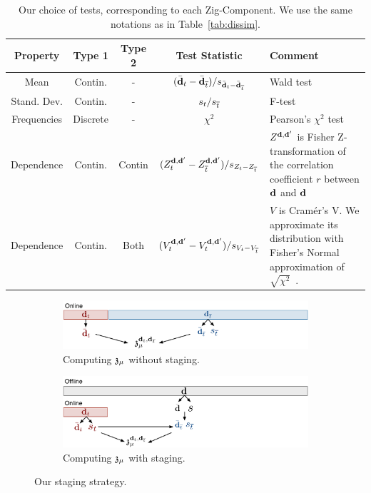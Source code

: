 \begin{table}[t!]
    \centering
    \begin{tabular}{c c c c p{8cm}}
    \rowcolor{gray!50}
      \hline
      Property & Type 1 & Type 2 & Test Statistic & Comment\\
      \hline
      Mean & Contin.  & - & $(\bar{\bf{d}}_t - \bar{\bf{d}}_{\overline{t}})/s_{\bar{\bf{d}}_t - \bar{\bf{d}}_{\overline{t}}}$ &
        Wald test~\cite{wasserman2013all}  \\
        Stand. Dev.& Contin.  & - & $s_t / s_{\overline{t}}$ &
        F-test~\cite{cohen1977statistical} \\
        Frequencies & Discrete & - & $\chi^2$ & Pearson's $\chi^2$
        test~\cite{wasserman2013all}\\
      Dependence  & Contin. & Contin & $(Z^{\bf{d}, \bf{d}'}_t - 
      Z^{\bf{d}, \bf{d}'}_{\overline{t}})/s_{Z_t - Z_{\overline{t}}}$ & $Z^{\bf{d}, \bf{d}'}$ is Fisher
      Z-transformation of the correlation coefficient $r$ between $\bf{d}$ and
      $\bf{d}$~\cite{fisher1915frequency}  \\
      Dependence  & Contin. & Both &  $(V^{\bf{d}, \bf{d}'}_t -
      V^{\bf{d}, \bf{d}'}_t)/s_{V_t-V_{\overline{t}}}$ & $V$ is
      Cram\'er's V. We approximate its distribution with Fisher's
      Normal approximation of $\sqrt{\chi^2}$~\cite{patel1996handbook}.\\ 
      \hline
    \end{tabular}
\caption{Our choice of tests, corresponding to each Zig-Component. We use the
same notations as in Table~\ref{tab:dissim}.}
    \label{tab:tests}
\end{table}
\begin{figure}[t!]
    \centering
    \begin{subfigure}[b]{\columnwidth}
    \includegraphics[width=\textwidth]{Figures/Staging}
    \caption{Computing $\mathfrak{z}_\mu$ without staging.}
    \label{pic:withoutstag}
    \end{subfigure}

    \begin{subfigure}[b]{\columnwidth}
        \includegraphics[width=\textwidth]{Figures/Staging2}
    \caption{Computing  $\mathfrak{z}_\mu$  with staging.}
    \label{pic:withstag}
    \end{subfigure}
    \caption{Our staging strategy.}
\end{figure}


